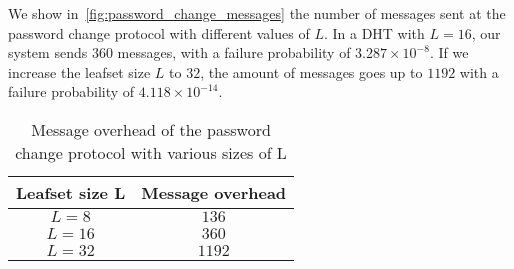     We show in~\ref{fig:password_change_messages} the number of messages sent at
the password change protocol with different values of $L$. In a DHT with
$L = 16$, our system sends $360$ messages, with a failure probability of
 $3.287 \times 10^{-8}$. If we increase the leafset size $L$ to $32$, the amount of
messages goes up to $1192$ with a failure probability of $4.118 \times 10^{-14}$.


\begin{table}
  \centering
  \footnotesize
  \begin{tabular}{|c|c|}
    \hline
     \textbf{Leafset size L} & \textbf{Message overhead}\\
    \hline
      $L = 8$ & $136$\\
    \hline
      $L = 16$ & $360$\\
    \hline
      $L = 32$ & $1192$\\
    \hline
  \end{tabular}
  \caption{Message overhead of the password change protocol with various sizes of L}
  \label{tab:password_change_messages}
\end{table}

